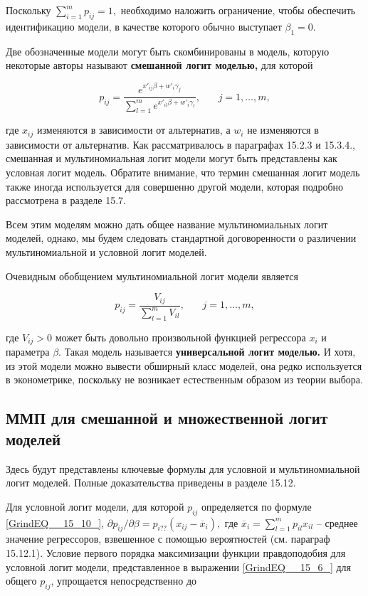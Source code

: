 Поскольку $\sum^m_{i=1}{p_{ij}}=1,$ необходимо наложить ограничение,  чтобы обеспечить идентификацию модели, в качестве которого обычно выступает ${\beta }_1=0.$

Две обозначенные модели могут быть скомбинированы в модель, которую некоторые авторы называют \textbf{смешанной логит моделью, }для которой

\begin{equation} \label{GrindEQ__15_12_} p_{ij}=\frac{e^{x'_{ij}\beta +w'_i{\gamma }_j}}{\sum^m_{l=1}{e^{x'_{il}\beta +w'_i{\gamma }_l}}},\ \ \ \ \ \ \ \ j=1,\dots ,m, \end{equation} 

где $x_{ij}$ изменяются в зависимости от альтернатив, а $w_i$ не изменяются в зависимости от альтернатив. Как рассматривалось в параграфах 15.2.3 и 15.3.4., смешанная и мультиномиальная логит модели могут быть представлены как условная логит модель. Обратите внимание, что термин смешанная логит модель также иногда используется для совершенно другой модели, которая подробно рассмотрена в разделе 15.7.

Всем этим моделям можно дать общее название мультиномиальных логит моделей, однако, мы будем следовать стандартной договоренности о различении мультиномиальной и условной логит моделей.

Очевидным обобщением мультиномиальной логит модели является

\begin{equation} \label{GrindEQ__15_13_} p_{ij}=\frac{V_{ij}}{\sum^m_{l=1}{V_{il}}},\ \ \ \ \ \ \ \ j=1,\dots ,m, \end{equation} 

где $V_{ij}>0$ может быть довольно произвольной функцией регрессора $x_i$ и параметра $\beta $. Такая модель называется \textbf{универсальной логит моделью.} И хотя, из этой модели можно вывести обширный класс моделей, она редко используется в эконометрике, поскольку не возникает естественным образом из теории выбора.

\subsection{ММП для смешанной и множественной логит моделей}

Здесь будут представлены ключевые формулы для условной и мультиномиальной логит моделей. Полные доказательства приведены в разделе 15.12.

Для условной логит модели, для которой $p_{ij}$ определяется по формуле \eqref{GrindEQ__15_10_}, ${\partial p_{ij}}/{\partial \beta }=p_{i??}\left(x_{ij}-{\overline{x}}_i\right),$  где ${\overline{x}}_i=\sum^m_{l=1}{p_{il}x_{il}}$ -- среднее значение регрессоров, взвешенное с помощью вероятностей (см. параграф 15.12.1). Условие первого порядка максимизации функции правдоподобия для условной логит модели, представленное в выражении \eqref{GrindEQ__15_6_} для общего $p_{ij}$, упрощается непосредственно до

